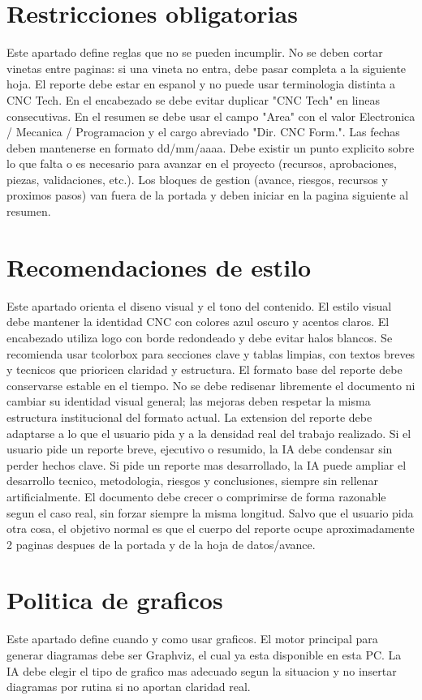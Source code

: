 \documentclass[11pt,a4paper]{article}
\begin{document}
\section{Restricciones obligatorias}
Este apartado define reglas que no se pueden incumplir. No se deben cortar
vinetas entre paginas: si una vineta no entra, debe pasar completa a la
siguiente hoja. El reporte debe estar en espanol y no puede usar terminologia
distinta a CNC Tech. En el encabezado se debe evitar duplicar "CNC Tech" en
lineas consecutivas. En el resumen se debe usar el campo "Area" con el valor
Electronica / Mecanica / Programacion y el cargo abreviado "Dir. CNC Form.".
Las fechas deben mantenerse en formato dd/mm/aaaa. Debe existir un punto
explicito sobre lo que falta o es necesario para avanzar en el proyecto
(recursos, aprobaciones, piezas, validaciones, etc.). Los bloques de gestion
(avance, riesgos, recursos y proximos pasos) van fuera de la portada y deben
iniciar en la pagina siguiente al resumen.

\section{Recomendaciones de estilo}
Este apartado orienta el diseno visual y el tono del contenido. El estilo
visual debe mantener la identidad CNC con colores azul oscuro y acentos claros.
El encabezado utiliza logo con borde redondeado y debe evitar halos blancos.
Se recomienda usar tcolorbox para secciones clave y tablas limpias, con textos
breves y tecnicos que prioricen claridad y estructura.
El formato base del reporte debe conservarse estable en el tiempo. No se debe
redisenar libremente el documento ni cambiar su identidad visual general; las
mejoras deben respetar la misma estructura institucional del formato actual.
La extension del reporte debe adaptarse a lo que el usuario pida y a la
densidad real del trabajo realizado. Si el usuario pide un reporte breve,
ejecutivo o resumido, la IA debe condensar sin perder hechos clave. Si pide un
reporte mas desarrollado, la IA puede ampliar el desarrollo tecnico,
metodologia, riesgos y conclusiones, siempre sin rellenar artificialmente.
El documento debe crecer o comprimirse de forma razonable segun el caso real,
sin forzar siempre la misma longitud. Salvo que el usuario pida otra cosa, el
objetivo normal es que el cuerpo del reporte ocupe aproximadamente 2 paginas
despues de la portada y de la hoja de datos/avance.

\section{Politica de graficos}
Este apartado define cuando y como usar graficos. El motor principal para
generar diagramas debe ser Graphviz, el cual ya esta disponible en esta PC. La
IA debe elegir el tipo de grafico mas adecuado segun la situacion y no insertar
diagramas por rutina si no aportan claridad real.
\end{document}
